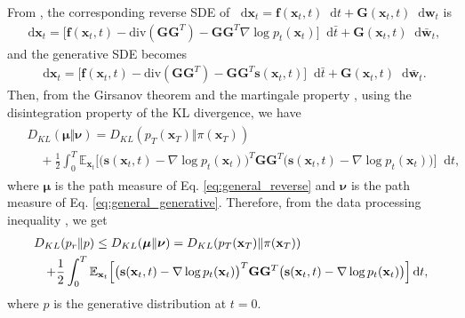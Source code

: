 \documentclass{article}
\theoremstyle{definition}
\theoremstyle{remark}
\newcommand*\diff{\mathop{}\!\mathrm{d}}
\begin{document}
	From \citet{anderson1982reverse}, the corresponding reverse SDE of $\diff\mathbf{x}_{t}=\mathbf{f}(\mathbf{x}_{t},t)\diff t+\mathbf{G}(\mathbf{x}_{t},t)\diff\mathbf{w}_{t}$ is
	\begin{align}\label{eq:general_reverse}
	\diff\mathbf{x}_{t}=\big[\mathbf{f}(\mathbf{x}_{t},t)-\text{div}(\mathbf{G}\mathbf{G}^{T})-\mathbf{G}\mathbf{G}^{T}\nabla\log{p_{t}(\mathbf{x}_{t})}\big]\diff \bar{t}+\mathbf{G}(\mathbf{x}_{t},t)\diff\mathbf{\bar{w}}_{t},
	\end{align}
	and the generative SDE becomes
	\begin{align}
	\diff\mathbf{x}_{t}=\big[\mathbf{f}(\mathbf{x}_{t},t)-\text{div}(\mathbf{G}\mathbf{G}^{T})-\mathbf{G}\mathbf{G}^{T}\mathbf{s}(\mathbf{x}_{t},t)\big]\diff \bar{t}+\mathbf{G}(\mathbf{x}_{t},t)\diff\mathbf{\bar{w}}_{t}.\label{eq:general_generative}
	\end{align}	
	Then, from the Girsanov theorem \cite{sarkka2019applied} and the martingale property \cite{oksendal2013stochastic}, using the disintegration property of the KL divergence, we have
	\begin{align}
	\begin{split}\label{eq:generalized_diffusion_loss}
	&D_{KL}(\bm{\mu}\Vert\bm{\nu})=D_{KL}(p_{T}(\mathbf{x}_{T})\Vert \pi(\mathbf{x}_{T}))\\
	&\quad+\frac{1}{2}\int_{0}^{T}\mathbb{E}_{\mathbf{x}_{t}}\Big[\big(\mathbf{s}(\mathbf{x}_{t},t)-\nabla\log{p_{t}(\mathbf{x}_{t})}\big)^{T}\mathbf{G}\mathbf{G}^{T}\big(\mathbf{s}(\mathbf{x}_{t},t)-\nabla\log{p_{t}(\mathbf{x}_{t})}\big)\Big]\diff t,
	\end{split}
	\end{align}
	where $\bm{\mu}$ is the path measure of Eq. \eqref{eq:general_reverse} and $\bm{\nu}$ is the path measure of Eq. \eqref{eq:general_generative}. Therefore, from the data processing inequality \cite{duchi2016lecture}, we get
	\begin{eqnarray*}
		\lefteqn{D_{KL}(p_{r}\Vert p)\le D_{KL}(\bm{\mu}\Vert\bm{\nu})=D_{KL}(p_{T}(\mathbf{x}_{T})\Vert \pi(\mathbf{x}_{T}))}&\\
		&&+\frac{1}{2}\int_{0}^{T}\mathbb{E}_{\mathbf{x}_{t}}\Big[\big(\mathbf{s}(\mathbf{x}_{t},t)-\nabla\log{p_{t}(\mathbf{x}_{t})}\big)^{T}\mathbf{G}\mathbf{G}^{T}\big(\mathbf{s}(\mathbf{x}_{t},t)-\nabla\log{p_{t}(\mathbf{x}_{t})}\big)\Big]\diff t,
	\end{eqnarray*}
	where $p$ is the generative distribution at $t=0$.
	
\end{document}
